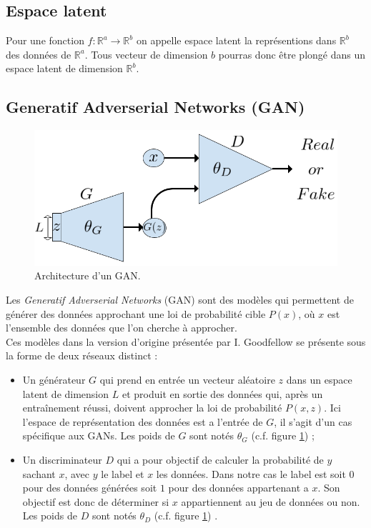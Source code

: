 \documentclass[11pt,francais]{article}
\begin{document}
\subsection{Espace latent}
Pour une fonction \(f : \mathbb{R}^a \rightarrow \mathbb{R}^b \) on appelle espace latent la représentions dans \(\mathbb{R}^b\) des données de \(\mathbb{R}^a\).
Tous vecteur de dimension \(b\) pourras donc être plongé dans un espace latent de dimension \(\mathbb{R}^b\).

\subsection{Generatif Adverserial Networks (GAN)}
\label{sec:GAN}
\begin{figure}[!h]
    \centering
    \includegraphics[width=\textwidth]{Figures/GAN/GAN_representation.png}
    \caption{Architecture d'un GAN.}
    \label{fig:fig9}
\end{figure}
Les \textit{Generatif Adverserial Networks} (GAN) sont des modèles qui permettent de générer des données approchant une loi de probabilité cible \(P(x)\), où \(x\) est l'ensemble des données que l'on cherche à approcher.\\
Ces modèles dans la version d'origine présentée par I. Goodfellow \cite{NIPS2014_5423} se présente sous la forme de deux réseaux distinct : \\
\begin{itemize}
  \item Un générateur \(G\) qui prend en entrée un vecteur aléatoire \(z\) dans un espace latent de dimension \(L\) et produit en sortie des données qui, après un entraînement réussi, doivent approcher la loi de probabilité \(P(x,z)\). Ici l'espace de représentation des données est a l'entrée de \(G\), il s'agit d'un cas spécifique aux GANs. Les poids de \(G\) sont notés \(\theta_G\) (c.f. figure \ref{fig:fig9}) ;\\
  \item Un discriminateur \(D\) qui a pour objectif de calculer la probabilité de \(y\) sachant \(x\), avec \(y\) le label et \(x\) les données. Dans notre cas le label est soit \(0\) pour des données générées soit \(1\) pour des données appartenant a \(x\). Son objectif est donc de déterminer si \(x\) appartiennent au jeu de données ou non. Les poids de \(D\) sont notés \(\theta_D\) (c.f. figure \ref{fig:fig9}) .\\
\end{itemize}
\end{document}

